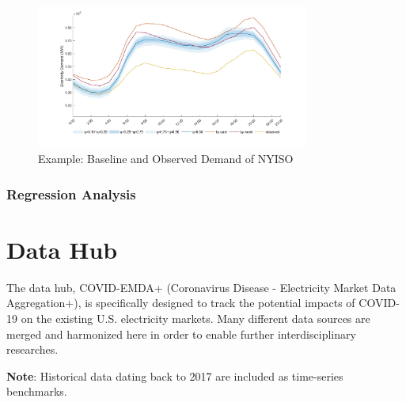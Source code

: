 \documentclass[10pt]{article}
\numberwithin{equation}{section}
\numberwithin{table}{section}
\numberwithin{figure}{section}
\begin{document}
\begin{figure}
  \centering
  \noindent\includegraphics[width=0.8\textwidth]{figures/example_backcast.jpg}
  \caption{Example: Baseline and Observed Demand of NYISO} \label{fig:backcast_eg}
\end{figure}



\subsubsection{Regression Analysis}



\newpage
\section{Data Hub} \label{sec:datahub}
The data hub, COVID-EMDA+ (Coronavirus Disease - Electricity Market Data Aggregation+), is specifically designed to track the potential impacts of COVID-19 on the existing U.S. electricity markets. Many different data sources are merged and harmonized here in order to enable further interdisciplinary researches. 

\textbf{Note}: Historical data dating back to 2017 are included as time-series benchmarks.
\end{document}
